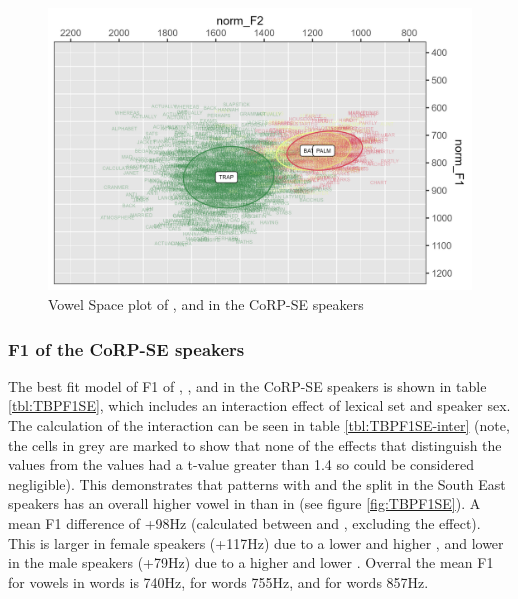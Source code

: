 \documentclass[../../../00.FullDoc/tex/APRReport-year4]{subfiles}
\begin{document}
\begin{figure}[h]
	\includegraphics[width=\textwidth]{../figures/TBP-SE-vplot.png}
	\caption{Vowel Space plot of \trap{},\bath{} and \palm{} in the CoRP-SE speakers} \label{fig:TBPvplotSE}
\end{figure}


\subsubsection{F1 of the CoRP-SE speakers}
The best fit model of F1 of \trap{}, \bath{}, and \palm{} in the CoRP-SE speakers is shown in table \ref{tbl:TBPF1SE}, which includes an interaction effect of lexical set and speaker sex. The calculation of the interaction can be seen in table \ref{tbl:TBPF1SE-inter} (note, the cells in grey are marked to show that none of the effects that distinguish the \palm{} values from the \bath{} values had a t-value greater than 1.4 so could be considered negligible). This demonstrates that \bath{} patterns with \palm{} and the \TB{} split in the South East speakers has an overall higher vowel in \trap{} than in \bath{} (see figure \ref{fig:TBPF1SE}). A mean F1 difference of +98Hz (calculated between \bath{} and \trap{}, excluding the \palm{} effect). This is larger in female speakers (+117Hz) due to a lower \bath{} and higher \trap{}, and lower in the male speakers (+79Hz) due to a higher \bath{} and lower \trap{}. Overral the mean F1 for vowels in \bath{} words is 740Hz, for \palm{} words 755Hz, and for \trap{} words 857Hz.

\end{document}
